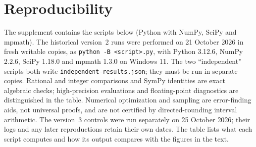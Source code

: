 \documentclass[11pt]{article}
\begin{document}
\section{Reproducibility}\label{app:repro}
The supplement contains the scripts below (Python with NumPy, SciPy and mpmath). The historical version~2 runs were performed on 21 October 2026 in fresh writable copies, as \texttt{python -B <script>.py}, with Python 3.12.6, NumPy 2.2.6, SciPy 1.18.0 and mpmath 1.3.0 on Windows 11. The two ``independent'' scripts both write \texttt{independent-results.json}; they must be run in separate copies. Rational and integer comparisons and SymPy identities are exact algebraic checks; high-precision evaluations and floating-point diagnostics are distinguished in the table. Numerical optimization and sampling are error-finding aids, not universal proofs, and are not certified by directed-rounding interval arithmetic. The version~3 controls were run separately on 25 October 2026; their logs and any later reproductions retain their own dates. The table lists what each script computes and how its output compares with the figures in the text.
\end{document}
